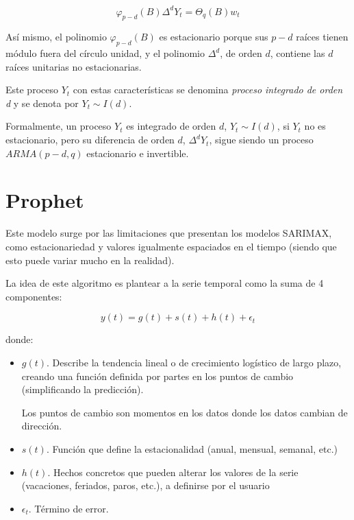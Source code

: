 \documentclass[a4paper,10pt]{article}
\begin{document}
\begin{equation}
\varphi_{p-d} (B) \Delta^d Y_t = \Theta_q (B) w_t
\end{equation}

Así mismo, el polinomio $\varphi_{p-d}(B)$ es estacionario porque sus $p-d$ raíces tienen módulo fuera del círculo unidad, y el polinomio $\Delta^d$, de orden $d$, contiene las $d$ raíces unitarias no estacionarias.

Este proceso $Y_t$ con estas características se denomina \textit{proceso integrado de orden d} y se denota por $Y_t \sim I(d)$.

Formalmente, un proceso $Y_t$ es integrado de orden $d$, $Y_t \sim I(d)$, si $Y_t$ no es estacionario, pero su diferencia de orden $d$, $\Delta^d Y_t$, sigue siendo un proceso $ARMA(p-d,q)$ estacionario e invertible.







\section{Prophet}

Este modelo surge por las limitaciones que presentan los modelos SARIMAX, como estacionariedad y valores igualmente espaciados en el tiempo (siendo que esto puede variar mucho en la realidad).

La idea de este algoritmo es plantear a la serie temporal como la suma de 4 componentes:

\begin{equation}
y(t) = g(t) + s(t) + h(t) + \epsilon_t
\end{equation}

donde:

\begin{itemize}
 \item $g(t)$. Describe la tendencia lineal o de crecimiento logístico de largo plazo, creando una función definida por partes en los puntos de cambio (simplificando la predicción).

 Los puntos de cambio son momentos en los datos donde los datos cambian de dirección.

  \item $s(t)$. Función que define la estacionalidad (anual, mensual, semanal, etc.)

  \item $h(t)$. Hechos concretos que pueden alterar los valores de la serie (vacaciones, feriados, paros, etc.), a definirse por el usuario

  \item $\epsilon_t$. Término de error.
\end{itemize}
\end{document}
